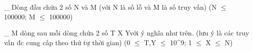 \_ Dòng đầu chứa 2 số N và M (với N là số lỗ và M là số truy vấn) (N $\le$ 100000; M $\le$ 100000)  

   \_ M dòng sau mỗi dòng chứa 2 số T X Yvới ý nghĩa như trên. (lưu ý là các truy vấn đc cung cấp theo thứ tự thời gian) (0 $\le$ T,Y $\le$ 10^9; 1 $\le$ X $\le$ N)  

\
